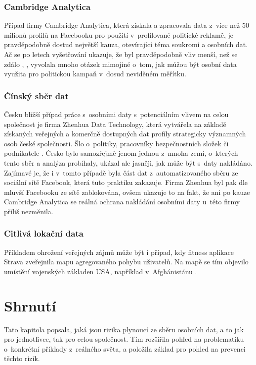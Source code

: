 \subsubsection*{Cambridge Analytica}
Případ firmy Cambridge Analytica, která získala a zpracovala data z~více než 50 milionů profilů na Facebooku \citep{cambridge-analytica} pro použití v~profilované politické reklamě, je pravděpodobně dostud největší kauza, otevírající téma soukromí a osobních dat. Ač se po letech vyšetřování ukazuje, že byl pravděpodobně vliv menší, než se zdálo \citep{ca-brexit}, \citep{ca-elections}, vyvolala mnoho otázek mimojiné o~tom, jak můžou být osobní data využita pro politickou kampaň v~dosud neviděném měřítku.

\subsubsection*{Čínský sběr dat}
Česku bližší případ práce s~osobními daty s~potenciálním vlivem na celou společnost je firma Zhenhua Data Technology, která vytvářela na základě získaných veřejných a komerčně dostupných dat profily strategicky významných osob české společnosti. Šlo o~politiky, pracovníky bezpečnostních složek či podnikatele \citep{china-czech}. Česko bylo samozřejmě jenom jednou z~mnoha zemí, o~kterých tento sběr a analýza probíhaly, ukázal ale jasněji, jak může být s~daty nakládáno.
Zajímavé je, že i v~tomto případě byla část dat z~automatizovaného sběru ze sociální sítě Facebook, která tuto praktiku zakazuje. Firma Zhenhua byl pak dle mluvší Facebooku ze sítě zablokována, ovšem ukazuje to na fakt, že ani po kauze Cambridge Analytica se reálná ochrana nakládání osobními daty u~této firmy příliš nezměnila.

\subsubsection*{Citlivá lokační data}
Příkladem ohrožení veřejných zájmů může být i případ, kdy fitness aplikace Strava zveřejnila mapu agregovaného pohybu uživatelů. Na mapě se tím objevilo umístění vojenských základen USA, například v~Afghánistánu \citep{strava-locations}. 

\section*{Shrnutí}
Tato kapitola popsala, jaká jsou rizika plynoucí ze sběru osobních dat, a to jak pro jednotlivce, tak pro celou společnost. Tím rozšířila pohled na problematiku o~konkrétní příklady z~reálného světa, a položila základ pro pohled na prevenci těchto rizik.